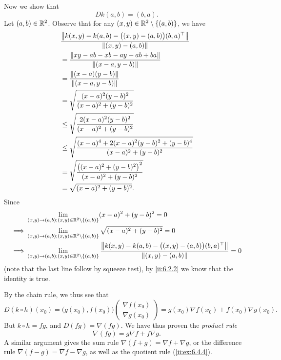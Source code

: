 \begin{eg}
  Now we show that
  \[
    D k(a, b) = (b, a).
  \]
  Let \((a, b) \in \R^2\).
  Observe that for any \((x, y) \in \R^2 \setminus \set{(a, b)}\), we have
  \begin{align*}
     & \dfrac{\norm*{k(x, y) - k(a, b) - \big((x, y) - (a, b)\big) (b, a)^\top}}{\norm*{(x, y) - (a, b)}} \\
     & = \dfrac{\norm*{xy - ab - xb - ay + ab + ba}}{\norm*{(x - a, y - b)}}                              \\
     & = \dfrac{\norm*{(x - a)(y - b)}}{\norm*{(x - a, y - b)}}                                           \\
     & = \sqrt{\dfrac{(x - a)^2 (y - b)^2}{(x - a)^2 + (y - b)^2}}                                        \\
     & \leq \sqrt{\dfrac{2 (x - a)^2 (y - b)^2}{(x - a)^2 + (y - b)^2}}                                   \\
     & \leq \sqrt{\dfrac{(x - a)^4 + 2 (x - a)^2 (y - b)^2 + (y - b)^4}{(x - a)^2 + (y - b)^2}}           \\
     & = \sqrt{\dfrac{\big((x - a)^2 + (y - b)^2\big)^2}{(x - a)^2 + (y - b)^2}}                          \\
     & = \sqrt{(x - a)^2 + (y - b)^2}.
  \end{align*}
  Since
  \begin{align*}
             & \lim_{(x, y) \to (a, b) ; (x, y) \in \R^2 \setminus \set{(a, b)}} (x - a)^2 + (y - b)^2 = 0                                                                              \\
    \implies & \lim_{(x, y) \to (a, b) ; (x, y) \in \R^2 \setminus \set{(a, b)}} \sqrt{(x - a)^2 + (y - b)^2} = 0                                                                       \\
    \implies & \lim_{(x, y) \to (a, b) ; (x, y) \in \R^2 \setminus \set{(a, b)}} \dfrac{\norm*{k(x, y) - k(a, b) - \big((x, y) - (a, b)\big) (b, a)^\top}}{\norm*{(x, y) - (a, b)}} = 0
  \end{align*}
  (note that the last line follow by squeeze test),
  by \cref{ii:6.2.2} we know that the identity is true.

  By the chain rule, we thus see that
  \[
    D (k \circ h)(x_0) = \big(g(x_0), f(x_0)\big) \begin{pmatrix}
      \nabla f(x_0) \\
      \nabla g(x_0)
    \end{pmatrix} = g(x_0) \nabla f(x_0) + f(x_0) \nabla g(x_0).
  \]
  But \(k \circ h = fg\), and \(D (fg) = \nabla (fg)\).
  We have thus proven the \emph{product rule}
  \[
    \nabla (fg) = g \nabla f + f \nabla g.
  \]
  A similar argument gives the sum rule \(\nabla (f + g) = \nabla f + \nabla g\), or the difference rule \(\nabla (f - g) = \nabla f - \nabla g\), as well as the quotient rule (\cref{ii:ex:6.4.4}).
\end{eg}

